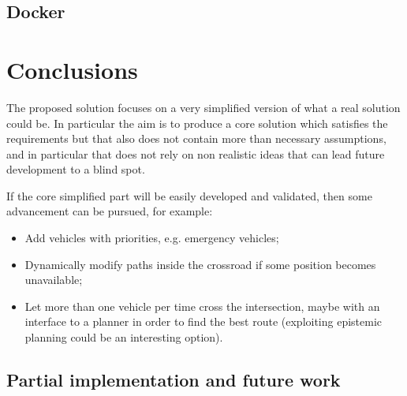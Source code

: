 \documentclass{memoir}
\begin{document}
\section{Docker}

\chapter{Conclusions}
The proposed solution focuses on a very simplified version of what a real solution could be. In particular the aim is to produce a core solution which satisfies the requirements but that also does not contain more than necessary assumptions, and in particular that does not rely on non realistic ideas that can lead future development to a blind spot.

If the core simplified part will be easily developed and validated, then some advancement can be pursued, for example:
\begin{itemize}
	\item Add vehicles with priorities, e.g. emergency vehicles;
	\item Dynamically modify paths inside the crossroad if some position becomes unavailable;
	\item Let more than one vehicle per time cross the intersection, maybe with an interface to a planner in order to find the best route (exploiting epistemic planning could be an interesting option).
\end{itemize}

\section{Partial implementation and future work}
\end{document}
